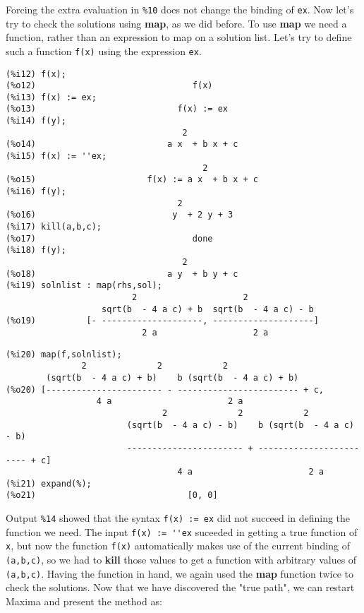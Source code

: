 \documentclass[12pt]{article}
\begin{document}
\normalsize
Forcing the extra evaluation in \verb|%10| does not change the binding of \verb|ex|.
Now let's try to check the solutions using \textbf{map}, as we did before.
To use \textbf{map} we need a function, rather than an expression to map on a solution list.
Let's try to define such a function \verb|f(x)| using the expression \verb|ex|.
\small
\begin{verbatim}
(%i12) f(x);
(%o12)                               f(x)
(%i13) f(x) := ex;
(%o13)                            f(x) := ex
(%i14) f(y);
                                   2
(%o14)                          a x  + b x + c
(%i15) f(x) := ''ex;
                                       2
(%o15)                      f(x) := a x  + b x + c
(%i16) f(y);
                                  2
(%o16)                           y  + 2 y + 3
(%i17) kill(a,b,c);
(%o17)                               done
(%i18) f(y);
                                   2
(%o18)                          a y  + b y + c
(%i19) solnlist : map(rhs,sol);
                         2                     2
                   sqrt(b  - 4 a c) + b  sqrt(b  - 4 a c) - b
(%o19)          [- --------------------, --------------------]
                           2 a                   2 a
\end{verbatim}
\newpage
\begin{verbatim}
(%i20) map(f,solnlist);
               2              2            2
        (sqrt(b  - 4 a c) + b)    b (sqrt(b  - 4 a c) + b)
(%o20) [----------------------- - ------------------------ + c, 
                  4 a                       2 a
                               2              2            2
                        (sqrt(b  - 4 a c) - b)    b (sqrt(b  - 4 a c) - b)
                        ----------------------- + ------------------------ + c]
                                  4 a                       2 a
(%i21) expand(%);
(%o21)                              [0, 0]
\end{verbatim}
\normalsize
Output \verb|%14| showed that the syntax \verb|f(x) := ex| did not succeed in defining
  the function we need.
The input \verb|f(x) := ''ex| suceeded in getting a true function of \verb|x|, but
  now the function \verb|f(x)| automatically makes use of the current binding of 
   \verb|(a,b,c)|, so we had to \textbf{kill} those values to get a function with
   arbitrary values of \verb|(a,b,c)|.
Having the function in hand, we again used the \textbf{map} function twice to check the
  solutions.
Now that we have discovered the "true path", we can restart Maxima and present the method as:
\end{document}
